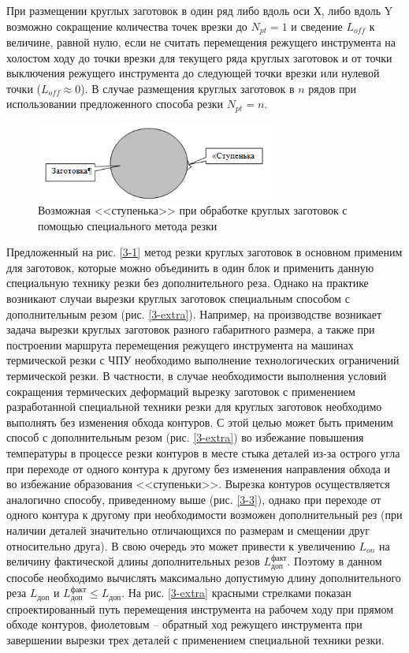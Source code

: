 \documentclass[11pt,twoside]{report}
\begin{document}
При размещении круглых заготовок в один ряд
либо вдоль оси Х, либо вдоль Y
возможно сокращение количества точек врезки до
$N_{pt}=1$
и сведение
$L_{off}$
к величине, равной нулю, если не считать перемещения
режущего инструмента на холостом ходу до точки врезки
для текущего ряда круглых заготовок и от точки выключения
режущего инструмента до следующей точки врезки или нулевой точки
($L_{off} \approx 0$).
В случае размещения круглых заготовок в $n$
рядов при использовании предложенного способа резки
$N_{pt}=n$.

\begin{figure}
  \begin{center}
  \includegraphics[width=0.7\textwidth]{hiccup.png}
  \caption{Возможная <<ступенька>> при обработке круглых заготовок с помощью специального метода резки}
  \label{hiccup}
  \end{center}
\end{figure}

Предложенный на рис. \ref{3-1}
метод резки круглых заготовок в основном применим для заготовок,
которые можно объединить в один блок и применить
данную специальную технику резки без дополнительного реза.
Однако на практике возникают случаи вырезки круглых заготовок
специальным способом с дополнительным резом
(рис. \ref{3-extra}).
Например, на производстве возникает задача
вырезки круглых заготовок разного габаритного размера,
а
также при построении маршрута перемещения режущего инструмента
на машинах термической резки с ЧПУ необходимо выполнение
технологических ограничений термической резки.
В частности, в случае необходимости выполнения условий
сокращения термических деформаций вырезку заготовок с
применением разработанной специальной техники резки
для круглых заготовок необходимо выполнять без изменения обхода контуров.
С этой целью может быть применим способ с дополнительным резом
(рис. \ref{3-extra})
во избежание повышения температуры в процессе резки контуров
в месте стыка деталей из-за острого угла
при переходе от одного контура к другому без изменения
направления обхода и во избежание образования <<ступеньки>>.
Вырезка контуров осуществляется аналогично способу,
приведенному выше (рис. \ref{3-3}),
однако при переходе от одного контура к другому
при необходимости возможен дополнительный рез
(при наличии деталей значительно отличающихся по размерам и смещении друг относительно друга).
В свою очередь это может привести к увеличению
$L_{on}$
на величину фактической длины дополнительных резов
$L_\text{доп}^\text{факт}$.
Поэтому в данном способе необходимо вычислять максимально допустимую длину дополнительного реза
$L_\text{доп}$
и
$L_\text{доп}^\text{факт} \leqslant L_\text{доп}$.
На рис. \ref{3-extra}
красными стрелками показан спроектированный путь
перемещения инструмента на рабочем ходу при прямом обходе контуров,
фиолетовым – обратный ход режущего инструмента
при завершении вырезки трех деталей с
применением специальной техники резки.
\end{document}
